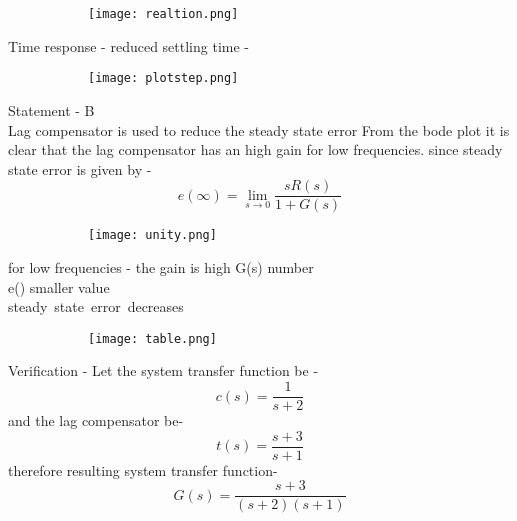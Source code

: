 \begin{enumerate}[label=\thesection.\arabic*.,ref=\thesection.\theenumi]
\begin{figure}[h]
 
\begin{subfigure}{\textwidth}
\texttt{[image: realtion.png]} 
\label{fig:subim1}
\end{subfigure}
\end{figure}

    



Time response - reduced settling time - 
\begin{figure}[h]
 
\begin{subfigure}{\textwidth}
\texttt{[image: plotstep.png]} 
\label{fig:subim1}
\end{subfigure}
\end{figure}

    
Statement - B\\Lag compensator is used to reduce the steady state error
From the bode plot it is clear that the lag compensator has an high gain for low frequencies.
since steady state error is given by - 
\begin{equation}
    e(\infty) = \lim_{s\to0} \frac{sR(s)}{1+G(s)}
\end{equation}
\begin{figure}[h]
 
\begin{subfigure}{\textwidth}
\texttt{[image: unity.png]} 
\label{fig:subim1}
\end{subfigure}
\end{figure}



for low frequencies - the gain is high \implies G(s) \to \large number\\
\implies e(\infty) \to smaller value\\
\implies steady\ state\ error\ decreases \\
\begin{figure}[h]
 
\begin{subfigure}{\textwidth}
\texttt{[image: table.png]} 
\label{fig:subim1}
\end{subfigure}
\end{figure}


Verification - 
Let the system transfer function be -
\begin{equation}
   c(s)= \frac{1}{s+2}
\end{equation}
and the lag compensator be- 
\begin{equation}
   t(s)= \frac{s+3}{s+1}
\end{equation}
therefore resulting system transfer function-
\begin{equation}
    G(s) = \frac{s+3}{(s+2)(s+1)}
\end{equation}


\end{enumerate}
